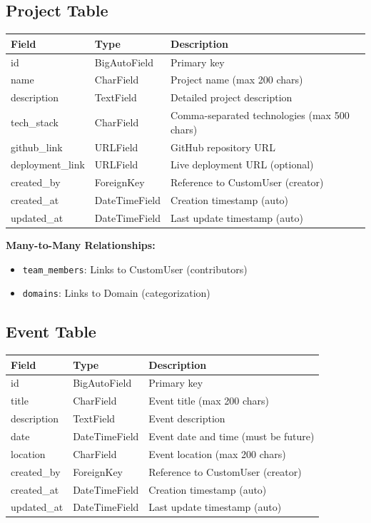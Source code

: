 \documentclass[11pt,a4paper]{article}
\begin{document}
\subsection{Project Table}
\begin{tabular}{|p{3cm}|p{3cm}|p{8cm}|}
\hline
\textbf{Field} & \textbf{Type} & \textbf{Description} \\
\hline
id & BigAutoField & Primary key \\
\hline
name & CharField & Project name (max 200 chars) \\
\hline
description & TextField & Detailed project description \\
\hline
tech\_stack & CharField & Comma-separated technologies (max 500 chars) \\
\hline
github\_link & URLField & GitHub repository URL \\
\hline
deployment\_link & URLField & Live deployment URL (optional) \\
\hline
created\_by & ForeignKey & Reference to CustomUser (creator) \\
\hline
created\_at & DateTimeField & Creation timestamp (auto) \\
\hline
updated\_at & DateTimeField & Last update timestamp (auto) \\
\hline
\end{tabular}

\textbf{Many-to-Many Relationships:}
\begin{itemize}[leftmargin=*]
    \item \texttt{team\_members}: Links to CustomUser (contributors)
    \item \texttt{domains}: Links to Domain (categorization)
\end{itemize}

\subsection{Event Table}
\begin{tabular}{|p{3cm}|p{3cm}|p{8cm}|}
\hline
\textbf{Field} & \textbf{Type} & \textbf{Description} \\
\hline
id & BigAutoField & Primary key \\
\hline
title & CharField & Event title (max 200 chars) \\
\hline
description & TextField & Event description \\
\hline
date & DateTimeField & Event date and time (must be future) \\
\hline
location & CharField & Event location (max 200 chars) \\
\hline
created\_by & ForeignKey & Reference to CustomUser (creator) \\
\hline
created\_at & DateTimeField & Creation timestamp (auto) \\
\hline
updated\_at & DateTimeField & Last update timestamp (auto) \\
\hline
\end{tabular}
\end{document}

